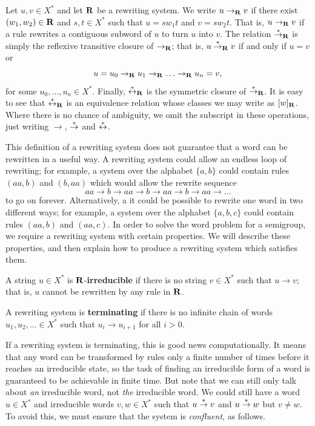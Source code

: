 Let $u, v \in X^*$ and let $\mathbf{R}$ be a rewriting system.
We write $u \to_{\mathbf{R}} v$ if there exist $(w_1, w_2) \in \mathbf{R}$ and
$s, t \in X^*$ such that $u=sw_1t$ and $v=sw_2t$.
That is, $u \to_{\mathbf{R}} v$ if a rule rewrites a contiguous subword of $u$ to turn
$u$ into $v$.  The relation $\stackrel{*}{\to}_{\mathbf{R}}$ is simply the reflexive transitive
closure of $\to_{\mathbf{R}}$; that is, $u \stackrel{*}{\to}_{\mathbf{R}} v$ if and only if $u = v$ or
$$u = u_0 \to_{\mathbf{R}} u_1 \to_{\mathbf{R}} \ldots \to_{\mathbf{R}} u_n = v,$$
for some $u_0, \ldots, u_n \in X^*$.
Finally, $\stackrel{*}{\leftrightarrow}_{\mathbf{R}}$ is the symmetric closure of
$\stackrel{*}{\to}_{\mathbf{R}}$.  It is easy to see that $\stackrel{*}{\leftrightarrow}_{\mathbf{R}}$ is an equivalence
relation whose classes we may write as $[w]_{\mathbf{R}}$.
Where there is no chance of ambiguity, we omit the subscript in these
operations, just writing $\to$, $\stackrel{*}{\to}$ and $\stackrel{*}{\leftrightarrow}$.

This definition of a rewriting system does not guarantee that a word can be
rewritten in a useful way.  A rewriting system could allow an endless loop of
rewriting; for example, a system over the alphabet $\{a,b\}$ could contain rules
$(aa,b)$ and $(b,aa)$ which would allow the rewrite sequence
$$aa \to b \to aa \to b \to aa \to b \to aa \to \ldots$$
to go on forever.  Alternatively, a it could be possible to rewrite one word in
two different ways; for example, a system over the alphabet $\{a,b,c\}$ could
contain rules $(aa,b)$ and $(aa,c)$.
In order to solve the word problem for a semigroup, we require a
rewriting system with certain properties.  We will describe these properties,
and then explain how to produce a rewriting system which satisfies them.

\begin{definition}
  A string $u \in X^*$ is $\mathbf{R}$-\textbf{irreducible} if there is no
  string $v \in X^*$ such that $u \to v$; that is, $u$ cannot be rewritten by
  any rule in $\mathbf{R}$.  \cite[Def~12.13]{cgt}
\end{definition}

\begin{definition}
  A rewriting system is \textbf{terminating} if there is no infinite chain of
  words $u_1, u_2, \ldots \in X^*$ such that $u_i \to u_{i+1}$ for all $i > 0$.
\end{definition}

If a rewriting system is terminating, this is good news computationally.  It
means that any word can be transformed by rules only a finite number of times
before it reaches an irreducible state, so the task of finding an irreducible
form of a word is guaranteed to be achievable in finite time.  But note that we
can still only talk about \textit{an} irreducible word, not \textit{the}
irreducible word.  We could still have a word $u \in X^*$ and irreducible words
$v, w \in X^*$ such that $u \stackrel{*}{\to} v$ and $u \stackrel{*}{\to} w$ but $v \neq w$.
To avoid this, we must ensure that the system is \textit{confluent}, as follows.

